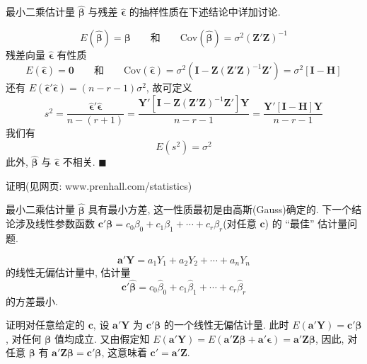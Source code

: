 

最小二乘估计量 $\hat{\boldsymbol{\beta}}$ 与残差 $\hat{\boldsymbol{\epsilon}}$ 的抽样性质在下述结论中详加讨论.

\[
E(\hat{\boldsymbol{\beta}})=\boldsymbol{\beta}\qquad\text{和}\qquad \text{Cov}(\hat{\boldsymbol{\beta}})=\sigma^2(\mathbf{Z}'\mathbf{Z})^{-1}
\]
残差向量 $\hat{\boldsymbol{\epsilon}}$ 有性质
\[
E(\hat{\boldsymbol{\epsilon}})=\mathbf{0}\qquad\text{和}\qquad
\text{Cov}(\hat{\boldsymbol{\epsilon}})=\sigma^2(\mathbf{I}-\mathbf{Z}(\mathbf{Z}'\mathbf{Z})^{-1}\mathbf{Z}')=\sigma^2[\mathbf{I}-\mathbf{H}]
\]
还有 $E(\hat{\boldsymbol{\epsilon}}'\hat{\boldsymbol{\epsilon}})=(n-r-1)\sigma^2$, 故可定义
\[
s^2=\frac{\hat{\boldsymbol{\epsilon}}'\hat{\boldsymbol{\epsilon}}}{n-(r+1)}
=\frac{\mathbf{Y}'[\mathbf{I}-\mathbf{Z}(\mathbf{Z}'\mathbf{Z})^{-1}\mathbf{Z}']\mathbf{Y}}{n-r-1}
=\frac{\mathbf{Y}'[\mathbf{I}-\mathbf{H}]\mathbf{Y}}{n-r-1}
\]
我们有
\[
E(s^2)=\sigma^2
\]
此外, $\hat{\boldsymbol{\beta}}$ 与 $\hat{\boldsymbol{\epsilon}}$ 不相关. \hfill$\blacksquare$

证明\quad (见网页: www.prenhall.com/statistics)

最小二乘估计量 $\hat{\boldsymbol{\beta}}$ 具有最小方差, 这一性质最初是由高斯(Gauss)确定的. 下一个结论涉及线性参数函数 $\mathbf{c}'\boldsymbol{\beta}=c_0\beta_0+c_1\beta_1+\cdots+c_r\beta_r$(对任意 $\mathbf{c}$) 的 ``最佳'' 估计量问题.

\[
\mathbf{a}'\mathbf{Y}=a_1 Y_1+a_2 Y_2+\cdots+a_n Y_n
\]
的线性无偏估计量中, 估计量
\[
\mathbf{c}'\hat{\boldsymbol{\beta}}=c_0\hat{\beta}_0+c_1\hat{\beta}_1+\cdots+c_r\hat{\beta}_r
\]
的方差最小.

证明\quad 对任意给定的 $\mathbf{c}$, 设 $\mathbf{a}'\mathbf{Y}$ 为 $\mathbf{c}'\boldsymbol{\beta}$ 的一个线性无偏估计量. 此时 $E(\mathbf{a}'\mathbf{Y})=\mathbf{c}'\boldsymbol{\beta}$, 对任何 $\boldsymbol{\beta}$ 值均成立. 又由假定知 $E(\mathbf{a}'\mathbf{Y})=E(\mathbf{a}'\mathbf{Z}\boldsymbol{\beta}+\mathbf{a}'\boldsymbol{\epsilon})=\mathbf{a}'\mathbf{Z}\boldsymbol{\beta}$, 因此, 对任意 $\boldsymbol{\beta}$ 有 $\mathbf{a}'\mathbf{Z}\boldsymbol{\beta}=\mathbf{c}'\boldsymbol{\beta}$, 这意味着 $\mathbf{c}'=\mathbf{a}'\mathbf{Z}$.

